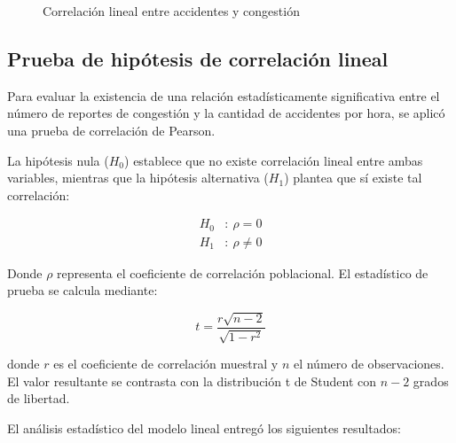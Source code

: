 \documentclass[12pt]{article}
\begin{document}

\begin{figure}[H]
    \centering
    \newline
    \newline
    \caption{Correlación lineal entre accidentes y congestión}
    \label{fig:corr_lineal}
\end{figure}

\subsection{Prueba de hipótesis de correlación lineal}

Para evaluar la existencia de una relación estadísticamente significativa entre el número de reportes de congestión y la cantidad de accidentes por hora, se aplicó una prueba de correlación de Pearson.

La hipótesis nula ($H_0$) establece que no existe correlación lineal entre ambas variables, mientras que la hipótesis alternativa ($H_1$) plantea que sí existe tal correlación:

\begin{align}
H_0&:\ \rho = 0 \\
H_1&:\ \rho \ne 0
\end{align}

Donde $\rho$ representa el coeficiente de correlación poblacional. El estadístico de prueba se calcula mediante:

\begin{equation}
t = \frac{r \sqrt{n - 2}}{\sqrt{1 - r^2}}
\end{equation}

donde $r$ es el coeficiente de correlación muestral y $n$ el número de observaciones. El valor resultante se contrasta con la distribución t de Student con $n - 2$ grados de libertad.

El análisis estadístico del modelo lineal entregó los siguientes resultados:
\end{document}
